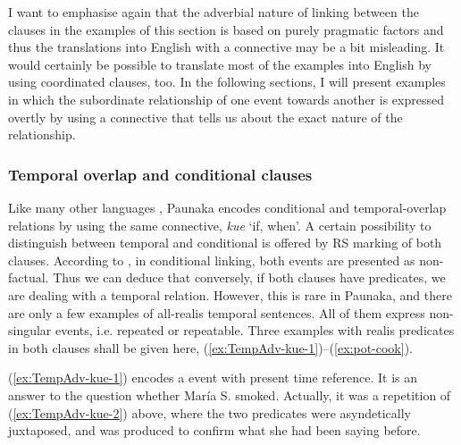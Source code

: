 I want to emphasise again that the adverbial nature of linking between the clauses in the examples of this section is based on purely pragmatic factors and thus the translations into English with a connective may be a bit misleading. It would certainly be possible to translate most of the examples into English by using coordinated clauses, too. In the following sections, I will present examples in which the subordinate relationship of one event towards another is expressed overtly by using a connective that tells us about the exact nature of the relationship. %




\subsubsection{Temporal overlap and conditional clauses}\label{sec:AC-kue}


Like many other languages \citep[cf.][161]{Cristofaro2003}, Paunaka encodes conditional and temporal-overlap relations by using the same connective, \textit{kue} ‘if, when’. A certain possibility to distinguish between temporal and conditional is offered by RS marking of both clauses. According to \citet[160]{Cristofaro2003}, in conditional linking, both events are presented as non-factual. Thus we can deduce that conversely, if both clauses have  predicates, we are dealing with a temporal relation. However, this is rare in Paunaka, and there are only a few examples of all-realis temporal sentences. All of them express non-singular events, i.e. repeated or repeatable. Three examples with realis predicates in both clauses shall be given here, (\ref{ex:TempAdv-kue-1})–(\ref{ex:pot-cook}). 

(\ref{ex:TempAdv-kue-1}) encodes a  event with present time reference. It is an answer to the question whether María S. smoked. Actually, it was a repetition of (\ref{ex:TempAdv-kue-2}) above, where the two predicates were asyndetically juxtaposed, and was produced to confirm what she had been saying before.

